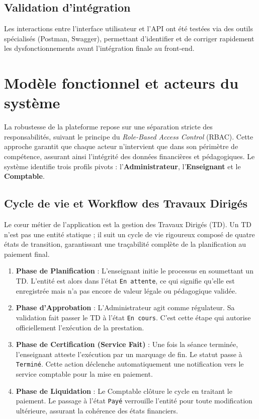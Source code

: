\subsection{Validation d'intégration}

Les interactions entre l'interface utilisateur et l'API ont été testées 
via des outils spécialisés (Postman, Swagger), permettant d'identifier 
et de corriger rapidement les dysfonctionnements avant l'intégration 
finale au front-end.

\section{Modèle fonctionnel et acteurs du système}

La robustesse de la plateforme repose sur une séparation stricte des responsabilités, suivant le principe du \textit{Role-Based Access Control} (RBAC). Cette approche garantit que chaque acteur n'intervient que dans son périmètre de compétence, assurant ainsi l'intégrité des données financières et pédagogiques. Le système identifie trois profils pivots : l'\textbf{Administrateur}, l'\textbf{Enseignant} et le \textbf{Comptable}.

\subsection{Cycle de vie et Workflow des Travaux Dirigés}

Le cœur métier de l'application est la gestion des Travaux Dirigés (TD). Un TD n'est pas une entité statique ; il suit un cycle de vie rigoureux composé de quatre états de transition, garantissant une traçabilité complète de la planification au paiement final.

\begin{enumerate}
    \item \textbf{Phase de Planification} : L'enseignant initie le processus en soumettant un TD. L'entité est alors dans l'état \texttt{En attente}, ce qui signifie qu'elle est enregistrée mais n'a pas encore de valeur légale ou pédagogique validée.
    \item \textbf{Phase d'Approbation} : L'Administrateur agit comme régulateur. Sa validation fait passer le TD à l'état \texttt{En cours}. C'est cette étape qui autorise officiellement l'exécution de la prestation.
    \item \textbf{Phase de Certification (Service Fait)} : Une fois la séance terminée, l'enseignant atteste l'exécution par un marquage de fin. Le statut passe à \texttt{Terminé}. Cette action déclenche automatiquement une notification vers le service comptable pour la mise en paiement.
    \item \textbf{Phase de Liquidation} : Le Comptable clôture le cycle en traitant le paiement. Le passage à l'état \texttt{Payé} verrouille l'entité pour toute modification ultérieure, assurant la cohérence des états financiers.
\end{enumerate}

